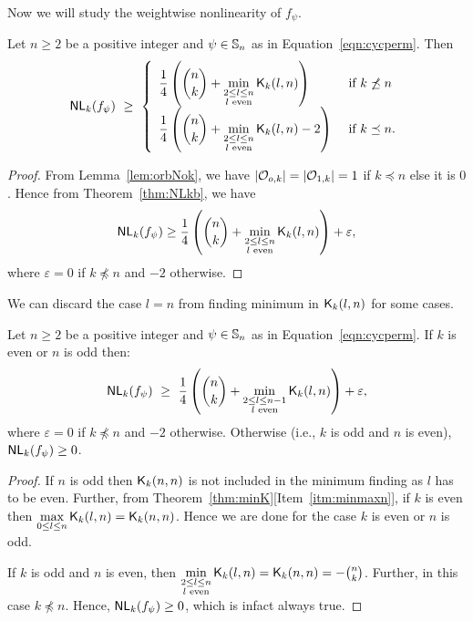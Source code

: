 \documentclass{llncs}
\begin{document}
Now we will study the weightwise nonlinearity of $f_\psi$.

\begin{theorem}\label{thm:NLk_bound}
Let $n \geq 2$ be a positive integer and $\psi \in \mathbb{S}_n$ as in  Equation~\ref{eqn:cycperm}.
Then $$\mathsf{NL}_{k}(f_\psi) ~\geq ~ 
\left\{ \begin{array}{ll}
\displaystyle{\frac{1}{4}\left({n \choose k} + \min_{\substack{2 \leq l \leq n \\ l \text{ even}}} \mathsf{K}_{k}(l,n)\right)}  & \text{ if }  k \not\preceq n \\
\displaystyle{\frac{1}{4}\left({n \choose k} + \min_{\substack{2 \leq l \leq n \\ l \text{ even}}} \mathsf{K}_{k}(l,n) - 2\right)} & \text{ if } k \preceq n.
\end{array}   \right.$$
\end{theorem}
\begin{proof}
From Lemma~\ref{lem:orbNok}, we have $|\mathcal{O}_{o,k}| = |\mathcal{O}_{1,k}| = 1$ if 
$k \preceq n$ else it is $0$. Hence from Theorem~\ref{thm:NLkb}, we have
$$\mathsf{NL}_{k}(f_\psi) \geq 
\displaystyle{\frac{1}{4}\left({n \choose k} + \min_{\substack{2 \leq l \leq n \\ l \text{ even}}} \mathsf{K}_{k}(l,n)\right)} + \varepsilon,$$
where $\varepsilon=0$ if $k \not\preceq n$ and $-2$ otherwise.
\end{proof}

We can discard the case $l = n$ from finding minimum in $\mathsf{K}_{k}(l,n)$ for some cases.
\begin{corollary}\label{cor:NLk_bound}
Let $n \geq 2$ be a positive integer and $\psi \in \mathbb{S}_n$ as in Equation~\ref{eqn:cycperm}. If $k$ is even or $n$ is odd then:
$$\mathsf{NL}_{k}(f_\psi) ~\geq ~ 
\displaystyle{\frac{1}{4}\left({n \choose k} + \min_{\substack{2 \leq l \leq n-1 \\ l \text{ even}}} \mathsf{K}_{k}(l,n)\right)}  + \varepsilon,$$
where $\varepsilon =0$ if $k \not\preceq n$ and $-2$ otherwise.
Otherwise (i.e., $k$ is odd and $n$ is even), $\mathsf{NL}_{k}(f_\psi) \geq 0$.
\end{corollary}
\begin{proof}
If $n$ is odd then $\mathsf{K}_{k}(n,n)$ is not included in the minimum finding as $l$ has to be even. Further, from Theorem~\ref{thm:minK}[Item~\ref{itm:minmaxn}], if $k$ is even then $\max\limits_{0 \leq l \leq n} \mathsf{K}_{k}(l,n) = \mathsf{K}_{k}(n,n)$. 
Hence we are done for the case $k$ is even or $n$ is odd.

If $k$ is odd and $n$ is even, then $\min\limits_{\substack{2 \leq l \leq n \\ l \text{ even}}} \mathsf{K}_{k}(l,n) = \mathsf{K}_{k}(n,n) = -{n \choose k}$. Further, in this case $k \not\preceq n$. Hence, $\mathsf{NL}_{k}(f_\psi) \geq 0$, which is infact always true.
\end{proof}
\end{document}
